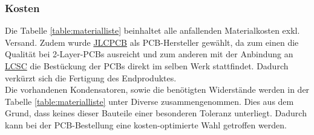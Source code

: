 \documentclass[12pt]{article}
\begin{document}
	\subsubsection{Kosten} \label{Kosten}
	Die Tabelle \ref{table:materialliste} beinhaltet alle anfallenden Materialkosten exkl. Versand. Zudem wurde \href{https://jlcpcb.com/}{JLCPCB} als PCB-Hersteller gewählt, da zum einen die Qualität bei 2-Layer-PCBs ausreicht und zum anderen mit der Anbindung an \href{https://www.lcsc.com/}{LCSC} die Bestückung der PCBs direkt im selben Werk stattfindet. Dadurch verkürzt sich die Fertigung des Endproduktes. \\
	Die vorhandenen Kondensatoren, sowie die benötigten Widerstände werden in der Tabelle \ref{table:materialliste} unter Diverse zusammengenommen. Dies aus dem Grund, dass keines dieser Bauteile einer besonderen Toleranz unterliegt. Dadurch kann bei der PCB-Bestellung eine kosten-optimierte Wahl getroffen werden.
\end{document}
